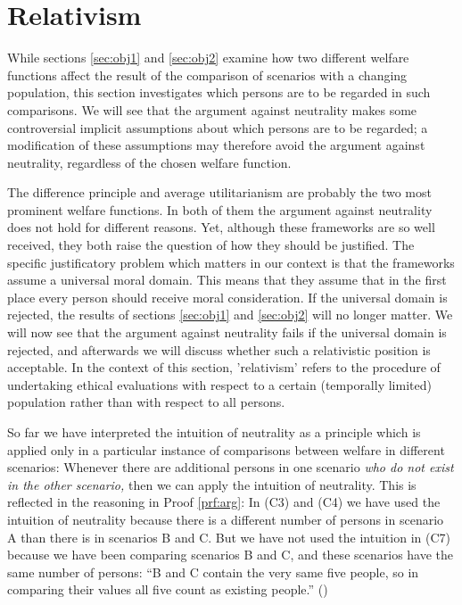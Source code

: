 \section{Relativism}
\label{sec:obj3}

While sections \ref{sec:obj1} and \ref{sec:obj2} examine how two different welfare functions affect the result of the comparison of scenarios with a changing population, this section investigates which persons are to be regarded in such comparisons. We will see that the argument against neutrality makes some controversial implicit assumptions about which persons are to be regarded; a modification of these assumptions may therefore avoid the argument against neutrality, regardless of the chosen welfare function. 

The difference principle and average utilitarianism are probably the two most prominent welfare functions. In both of them the argument against neutrality does not hold for different reasons. Yet, although these frameworks are so well received, they both raise the question of how they should be justified. The specific justificatory problem which matters in our context is that the frameworks assume a universal moral domain. This means that they assume that in the first place every person should receive moral consideration. If the universal domain is rejected, the results of sections \ref{sec:obj1} and \ref{sec:obj2} will no longer matter. We will now see that the argument against neutrality fails if the universal domain is rejected, and afterwards we will discuss whether such a relativistic position is acceptable. In the context of this section, 'relativism' refers to the procedure of undertaking ethical evaluations with respect to a certain (temporally limited) population rather than with respect to all persons. 

So far we have interpreted the intuition of neutrality as a principle which is applied only in a particular instance of comparisons between welfare in different scenarios: Whenever there are additional persons in one scenario \emph{who do not exist in the other scenario,} then we can apply the intuition of neutrality. This is reflected in the reasoning in Proof \ref{prf:arg}: In (C3) and (C4) we have used the intuition of neutrality because there is a different number of persons in scenario A than there is in scenarios B and C. But we have not used the intuition in (C7) because we have been comparing scenarios B and C, and these scenarios have the same number of persons: “B and C contain the very same five people, so in comparing their values all five count as existing people.” () 

